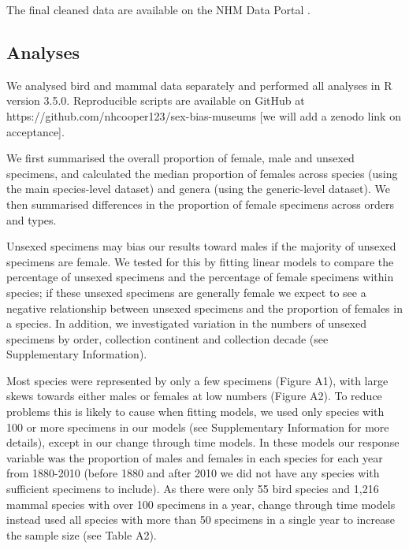 \documentclass[a4paper, 12pt]{article}
\begin{document}
The final cleaned data are available on the NHM Data Portal \cite{sex-bias-data}. 

\subsection{Analyses}
We analysed bird and mammal data separately and performed all analyses in R version 3.5.0\cite{R}. 
Reproducible scripts are available on GitHub at https://github.com/nhcooper123/sex-bias-museums [we will add a zenodo link on acceptance].

We first summarised the overall proportion of female, male and unsexed specimens, and calculated the median proportion of females across species (using the main species-level dataset) and genera (using the generic-level dataset). 
We then summarised differences in the proportion of female specimens across orders and types. 

Unsexed specimens may bias our results toward males if the majority of unsexed specimens are female. 
We tested for this by fitting linear models to compare the percentage of unsexed specimens and the percentage of female specimens within species; if these unsexed specimens are generally female we expect to see a negative relationship between unsexed specimens and the proportion of females in a species. 
In addition, we investigated variation in the numbers of unsexed specimens by order, collection continent and collection decade (see Supplementary Information).

Most species were represented by only a few specimens (Figure A1), with large skews towards either males or females at low numbers (Figure A2). 
To reduce problems this is likely to cause when fitting models, we used only species with 100 or more specimens in our models (see Supplementary Information for more details), except in our change through time models. 
In these models our response variable was the proportion of males and females in each species for each year from 1880-2010 (before 1880 and after 2010 we did not have any species with sufficient specimens to include). 
As there were only 55 bird species and 1,216 mammal species with over 100 specimens in a year, change through time models instead used all species with more than 50 specimens in a single year to increase the sample size (see Table A2).
\end{document}
